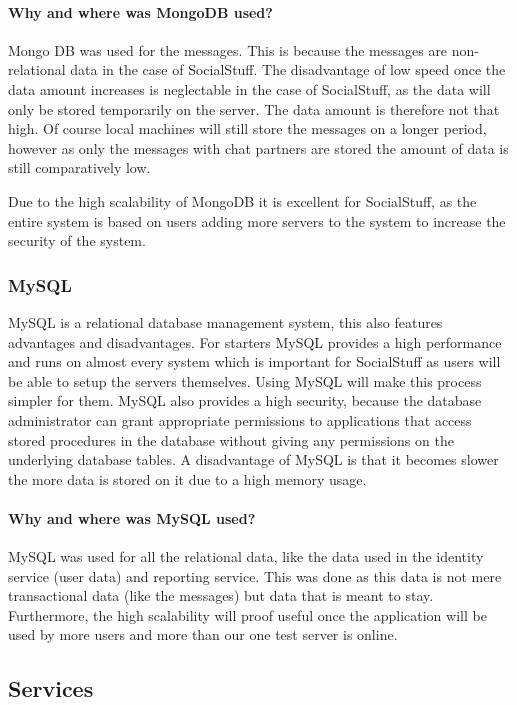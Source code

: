 \paragraph{Why and where was MongoDB used?}
Mongo DB was used for the messages.
This is because the messages are non-relational data in the case of SocialStuff.
The disadvantage of low speed once the data amount increases is neglectable in the case of SocialStuff, as the data will
only be stored temporarily on the server.
The data amount is therefore not that high.
Of course local machines will still store the messages on a longer period, however as only the messages with chat
partners are stored the amount of data is still comparatively low.

Due to the high scalability of MongoDB it is excellent for SocialStuff, as the entire system is based on users adding
more servers to the system to increase the security of the system.

\subsubsection{MySQL}
MySQL is a relational database management system, this also features advantages and disadvantages.
For starters MySQL provides a high performance and runs on almost every system which is important for SocialStuff as
users will be able to setup the servers themselves.
Using MySQL will make this process simpler for them.
MySQL also provides a high security, because the database administrator can grant appropriate permissions to
applications that access stored procedures in the database without giving any permissions on the underlying database
tables.
A disadvantage of MySQL is that it becomes slower the more data is stored on it due to a high memory usage.

\paragraph{Why and where was MySQL used?}
MySQL was used for all the relational data, like the data used in the identity service (user data) and reporting
service.
This was done as this data is not mere transactional data (like the messages) but data that is meant to stay.
Furthermore, the high scalability will proof useful once the application will be used by more users and more than our
one test server is online.

\subsection{Services}\label{subsec:services2}

